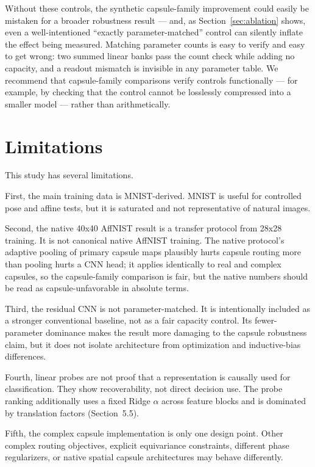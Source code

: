 \documentclass[11pt]{article}
\begin{document}
Without these controls, the synthetic capsule-family improvement could easily be mistaken for a broader robustness result --- and, as Section~\ref{sec:ablation} shows, even a well-intentioned ``exactly parameter-matched'' control can silently inflate the effect being measured. Matching parameter counts is easy to verify and easy to get wrong: two summed linear banks pass the count check while adding no capacity, and a readout mismatch is invisible in any parameter table. We recommend that capsule-family comparisons verify controls functionally --- for example, by checking that the control cannot be losslessly compressed into a smaller model --- rather than arithmetically.

\section{Limitations}
This study has several limitations.

First, the main training data is MNIST-derived. MNIST is useful for controlled pose and affine tests, but it is saturated and not representative of natural images.

Second, the native 40x40 AffNIST result is a transfer protocol from 28x28 training. It is not canonical native AffNIST training. The native protocol's adaptive pooling of primary capsule maps plausibly hurts capsule routing more than pooling hurts a CNN head; it applies identically to real and complex capsules, so the capsule-family comparison is fair, but the native numbers should be read as capsule-unfavorable in absolute terms.

Third, the residual CNN is not parameter-matched. It is intentionally included as a stronger conventional baseline, not as a fair capacity control. Its fewer-parameter dominance makes the result more damaging to the capsule robustness claim, but it does not isolate architecture from optimization and inductive-bias differences.

Fourth, linear probes are not proof that a representation is causally used for classification. They show recoverability, not direct decision use. The probe ranking additionally uses a fixed Ridge $\alpha$ across feature blocks and is dominated by translation factors (Section~5.5).

Fifth, the complex capsule implementation is only one design point. Other complex routing objectives, explicit equivariance constraints, different phase regularizers, or native spatial capsule architectures may behave differently.
\end{document}

